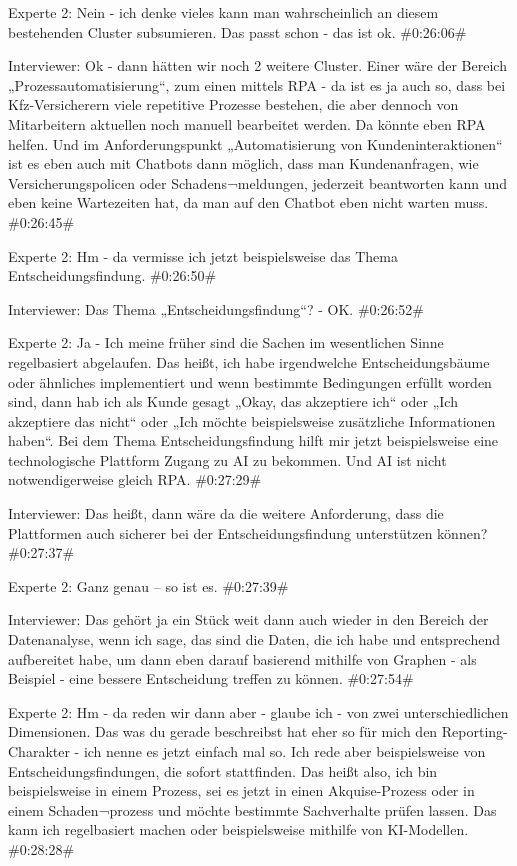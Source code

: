 Experte 2:
Nein - ich denke vieles kann man wahrscheinlich an diesem bestehenden Cluster subsumieren. Das passt schon - das ist ok.
\#0:26:06\#

Interviewer:
Ok - dann hätten wir noch 2 weitere Cluster. Einer wäre der Bereich „Prozessautomatisierung“, zum einen mittels RPA - da ist es ja auch so, dass bei Kfz-Versicherern viele repetitive Prozesse bestehen, die aber dennoch von Mitarbeitern aktuellen noch manuell bearbeitet werden. Da könnte eben RPA helfen. Und im Anforderungspunkt „Automatisierung von Kundeninteraktionen“ ist es eben auch mit Chatbots dann möglich, dass man Kundenanfragen, wie Versicherungspolicen oder Schadens¬meldungen, jederzeit beantworten kann und eben keine Wartezeiten hat, da man auf den Chatbot eben nicht warten muss.
\#0:26:45\#

Experte 2:
Hm - da vermisse ich jetzt beispielsweise das Thema Entscheidungsfindung.
\#0:26:50\#

Interviewer:
Das Thema „Entscheidungsfindung“? - OK.
\#0:26:52\#

Experte 2:
Ja - Ich meine früher sind die Sachen im wesentlichen Sinne regelbasiert abgelaufen. Das heißt, ich habe irgendwelche Entscheidungsbäume oder ähnliches implementiert und wenn bestimmte Bedingungen erfüllt worden sind, dann hab ich als Kunde gesagt „Okay, das akzeptiere ich“ oder „Ich akzeptiere das nicht“ oder „Ich möchte beispielsweise zusätzliche Informationen haben“. Bei dem Thema Entscheidungsfindung hilft mir jetzt beispielsweise eine technologische Plattform Zugang zu AI zu bekommen. Und AI ist nicht notwendigerweise gleich RPA.
\#0:27:29\#

Interviewer:
Das heißt, dann wäre da die weitere Anforderung, dass die Plattformen auch sicherer bei der Entscheidungsfindung unterstützen können?
\#0:27:37\#

Experte 2:
Ganz genau – so ist es.
\#0:27:39\#

Interviewer:
Das gehört ja ein Stück weit dann auch wieder in den Bereich der Datenanalyse, wenn ich sage, das sind die Daten, die ich habe und entsprechend aufbereitet habe, um dann eben darauf basierend mithilfe von Graphen - als Beispiel - eine bessere Entscheidung treffen zu können.
\#0:27:54\#

Experte 2:
Hm - da reden wir dann aber - glaube ich - von zwei unterschiedlichen Dimensionen. Das was du gerade beschreibst hat eher so für mich den Reporting-Charakter - ich nenne es jetzt einfach mal so. Ich rede aber beispielsweise von Entscheidungsfindungen, die sofort stattfinden. Das heißt also, ich bin beispielsweise in einem Prozess, sei es jetzt in einen Akquise-Prozess oder in einem Schaden¬prozess und möchte bestimmte Sachverhalte prüfen lassen. Das kann ich regelbasiert machen oder beispielsweise mithilfe von KI-Modellen.
\#0:28:28\#

